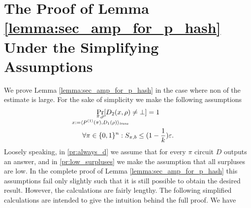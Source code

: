 \section{The Proof of Lemma \ref{lemma:sec_amp_for_p_hash} Under the Simplifying Assumptions}
\label{st:proofSimAssm}
We prove Lemma \ref{lemma:sec_amp_for_p_hash} in the case where non of the estimate is large.
For the sake of simplicity we make the following assumptions
\begin{gather}
  \label{pr:always_d}
\underset{
  \mathclap{
  \substack{\pi, \rho \\ x := \langle P^{(1)}(\pi), D_1(\rho) \rangle_{\trans}}}}
{\Pr}[D_2(x,\rho) \neq \bot] = 1 \\
  \label{pr:low_surpluses}
\forall \pi \in \{0,1\}^{n} : S_{\pi, b} \leq (1 - \frac{1}{k})\epsilon.
\end{gather}
Loosely speaking, in \eqref{pr:always_d} we assume that for every $\pi$ circuit $D$ outputs an answer,
and in \eqref{pr:low_surpluses} we make the assumption that all surpluses are low.
In the complete proof of Lemma \ref{lemma:sec_amp_for_p_hash} this assumptions fail only slightly such that it is still possible
to obtain the desired result. However, the calculations are fairly lengthy.
The following simplified calculations are intended to give the intuition behind the full proof.
We have
